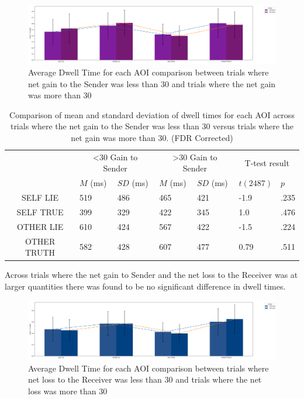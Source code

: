 \documentclass[man, floatsintext]{apa7}
\begin{document}
\begin{figure}[H]
	\includegraphics[width=\linewidth]{../plots/RESPONSE/AvgDwellPerGain30.png}
	\caption{Average Dwell Time for each AOI comparison between trials where net gain to the Sender was less than 30 and trials where the net gain was more than 30}
	\label{fig:AvgDwellPerGain30}
\end{figure}

\begin{table}[H]
	\centering
	\begin{tabular}{|c|p{1.5cm}|p{2cm}|p{1.5cm}|p{2cm}|p{2cm}|p{1.5cm}|}
		\hline
		\multirow{2}{*}{} & \multicolumn{2}{c|}{<30 Gain to Sender} & \multicolumn{2}{c|}{>30 Gain to Sender} & \multicolumn{2}{c|}{T-test result} \\ \cline{2-7}
		& $M$ (ms) &$SD$ (ms) & $M$ (ms) & $SD$ (ms) & $t(2487)$ & $p$ \\ \hline
		SELF LIE& 519 & 486 & 465 & 421 & -1.9 & .235  \\ \hline
		SELF TRUE & 399 & 329 & 422 & 345 & 1.0 & .476  \\ \hline
		OTHER LIE & 610 & 424 & 567 & 422 & -1.5 & .224 \\ \hline
		OTHER TRUTH & 582 & 428 & 607 & 477 & 0.79 & .511 \\ \hline
	\end{tabular}
	\vspace{0.3cm}
	\caption{Comparison of mean and standard deviation of dwell times for each AOI across trials where the net gain to the Sender was less than 30 versus trials where the net gain was more than 30. (FDR Corrected)}
	\label{tab:NetGainDwell30}
\end{table}

Across trials where the net gain to Sender and the net loss to the Receiver was at larger quantities there was found to be no significant difference in dwell times.

\begin{figure}[H]
	\includegraphics[width=\linewidth]{../plots/RESPONSE/AvgDwellPerLossPlot30.png}
	\caption{Average Dwell Time for each AOI comparison between trials where net loss to the Receiver was less than 30 and trials where the net loss was more than 30}
	\label{fig:AvgDwellPerLoss30}
\end{figure}
\end{document}
